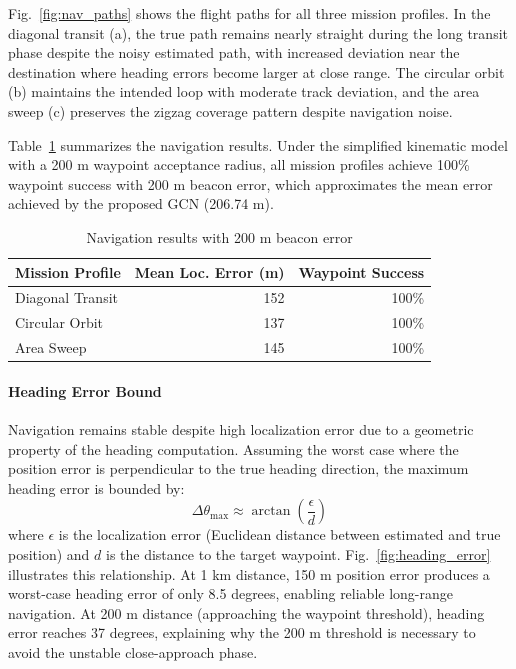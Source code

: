 \documentclass{ieeeaccess}
\begin{document}
Fig.~\ref{fig:nav_paths} shows the flight paths for all three mission profiles. In the diagonal transit (a), the true path remains nearly straight during the long transit phase despite the noisy estimated path, with increased deviation near the destination where heading errors become larger at close range. The circular orbit (b) maintains the intended loop with moderate track deviation, and the area sweep (c) preserves the zigzag coverage pattern despite navigation noise.

Table~\ref{tab:nav_results} summarizes the navigation results. Under the simplified kinematic model with a 200 m waypoint acceptance radius, all mission profiles achieve 100\% waypoint success with 200 m beacon error, which approximates the mean error achieved by the proposed GCN (206.74 m).

\begin{table}[!t]
\caption{Navigation results with 200 m beacon error\label{tab:nav_results}}
\centering
\begin{tabular}{l|r r}
\hline
\textbf{Mission Profile} & \textbf{Mean Loc. Error (m)} & \textbf{Waypoint Success}\\
\hline
Diagonal Transit & 152 & 100\%\\
Circular Orbit & 137 & 100\%\\
Area Sweep & 145 & 100\%\\
\hline
\end{tabular}
\end{table}

\paragraph{Heading Error Bound}
Navigation remains stable despite high localization error due to a geometric property of the heading computation. Assuming the worst case where the position error is perpendicular to the true heading direction, the maximum heading error is bounded by:
\begin{equation}
\Delta\theta_{\max} \approx \arctan\left(\frac{\epsilon}{d}\right)
\label{eq:heading_error}
\end{equation}
where $\epsilon$ is the localization error (Euclidean distance between estimated and true position) and $d$ is the distance to the target waypoint. Fig.~\ref{fig:heading_error} illustrates this relationship. At 1 km distance, 150 m position error produces a worst-case heading error of only 8.5 degrees, enabling reliable long-range navigation. At 200 m distance (approaching the waypoint threshold), heading error reaches 37 degrees, explaining why the 200 m threshold is necessary to avoid the unstable close-approach phase.
\end{document}
